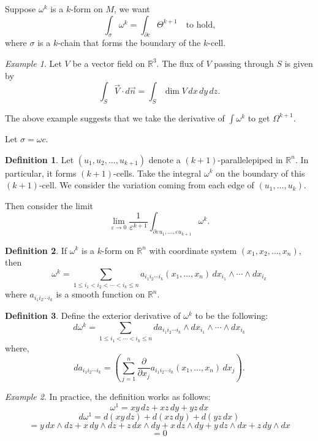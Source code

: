 \documentclass[11pt]{article}
\theoremstyle{definition}
\newtheorem{definition}{Definition}[section]
\theoremstyle{remark}
\newtheorem{example}{Example}[section]
\begin{document}
Suppose $\omega^k$ is a $k$-form on $M$, we want
\[
\int_{\sigma} \omega^k = \int_{\partial c} \Theta^{k+1} \quad \text{to hold,}
\]
where $\sigma$ is a $k$-chain that forms the boundary of the $k$-cell.

\begin{example}\label{ex:flux_vector_field}
Let $V$ be a vector field on $\mathbb{R}^3$. The flux of $V$ passing through $S$ is given by
\[
\int_S \vec{V} \cdot d\vec{n} = \int_S \dim V \, dx \, dy \, dz.
\]
\end{example}

The above example suggests that we take the derivative of $\int \omega^k$ to get $\Omega^{k+1}$.

Let $\sigma = \omega c$.

\begin{definition}\label{def:parallelepiped_cell}
Let $(u_1, u_2, \dots, u_{k+1})$ denote a $(k+1)$-parallelepiped in $\mathbb{R}^n$. In particular, it forms $(k+1)$-cells. Take the integral $\omega^k$ on the boundary of this $(k+1)$-cell. We consider the variation coming from each edge of $(u_1, \dots, u_k)$.
\end{definition}

Then consider the limit
\[
\lim_{\varepsilon \to 0} \frac{1}{\varepsilon^{k+1}} \int_{\partial \varepsilon u_1, \dots, \varepsilon u_{k+1}} \omega^k.
\]

\begin{definition}\label{def:kform_coords}
If $\omega^k$ is a $k$-form on $\mathbb{R}^n$ with coordinate system $(x_1, x_2, \ldots, x_n)$, then
\[
\omega^k = \sum_{1 \leq i_1 < i_2 < \cdots < i_k \leq n} a_{i_1 i_2 \cdots i_k}(x_1, \ldots, x_n) \, dx_{i_1} \wedge \cdots \wedge dx_{i_k}
\]
where $a_{i_1 i_2 \cdots i_k}$ is a smooth function on $\mathbb{R}^n$.
\end{definition}

\begin{definition}\label{def:exterior_derivative}
Define the exterior derivative of $\omega^k$ to be the following:
\[
d\omega^k = \sum_{1 \leq i_1 < \cdots < i_k \leq n} da_{i_1 i_2 \cdots i_k} \wedge dx_{i_1} \wedge \cdots \wedge dx_{i_k}
\]
where,
\[
da_{i_1 i_2 \cdots i_k} = \left( \sum_{j=1}^n \frac{\partial}{\partial x_j} a_{i_1 i_2 \cdots i_k}(x_1, \ldots, x_n) \, dx_j \right).
\]
\end{definition}

\begin{example}\label{ex:exterior_derivative_practice}
In practice, the definition works as follows:
\[
\omega^1 = x y \, dz + x z \, dy + y z \, dx
\]
\[
d\omega^1 = d(xy \, dz) + d(xz \, dy) + d(yz \, dx)
\]
\[
= y \, dx \wedge dz + x \, dy \wedge dz + z \, dx \wedge dy + x \, dz \wedge dy + y \, dz \wedge dx + z \, dy \wedge dx
\]
\[
= 0
\]
\end{example}
\end{document}
